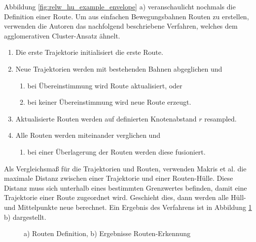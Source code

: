 Abbildung \ref{fig:relw_hu_example_envelope} a) veranschaulicht nochmals die Definition einer Route.
Um aus einfachen Bewegungsbahnen Routen zu erstellen, verwenden die Autoren das nachfolgend beschriebene Verfahren,
welches dem agglomerativen Cluster-Ansatz ähnelt.

\begin{enumerate}
    \item Die erste Trajektorie initialisiert die erste Route.
    \item Neue Trajektorien werden mit bestehenden Bahnen abgeglichen und
    \begin{enumerate}
        \item bei Übereinstimmung wird Route aktualisiert, oder
        \item bei keiner Übereinstimmung wird neue Route erzeugt.
    \end{enumerate}
    \item Aktualisierte Routen werden auf definierten Knotenabstand $r$ resampled.
    \item Alle Routen werden miteinander verglichen und
    \begin{enumerate}
        \item bei einer Überlagerung der Routen werden diese fusioniert.
    \end{enumerate}
\end{enumerate}

Als Vergleichsmaß für die Trajektorien und Routen, verwenden Makris et al. die maximale Distanz zwischen einer Trajektorie und
einer Routen-Hülle. Diese Distanz muss sich unterhalb eines bestimmten Grenzwertes befinden, damit eine Trajektorie
einer Route zugeordnet wird. Geschieht dies, dann werden alle Hüll- und Mittelpunkte neue berechnet.
Ein Ergebnis des Verfahrens ist in Abbildung \ref{fig:relw_results_makris} b) dargestellt.

\begin{figure}[H]
    \centering
    \qquad
    \caption[Routen-Definition und Ergebnisse Routen-Erkennung (Makris et al.)]{a) Routen Definition, b) Ergebnisse Routen-Erkennung \cite[]{Makris2005}}
    \label{fig:relw_results_makris}
\end{figure}


